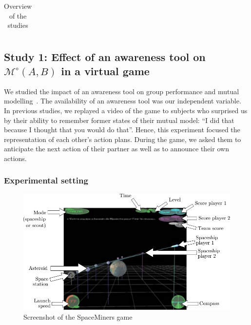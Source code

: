 \documentclass[natbib]{svjour3}
\newcommand{\gModel}[2]{{$\mathcal{M}^{\circ}(#1, #2)$}}
\begin{document}
\begin{table}[ht!]
\begin{tabular}{p{2.1cm}L{1.65cm}L{1.7cm}L{1.8cm}L{1.6cm}L{1.6cm}}
\bottomrule
\end{tabular}
\caption{Overview of the studies}
\label{synthesis_table}
\end{table}



\subsection{{\bf Study 1}: Effect of an awareness tool on \gModel{A}{B} in a virtual
game}

We studied the impact of an awareness tool on group performance and mutual
modelling~\citep{nova2007collaboration}. The availability of an
awareness tool was our independent variable. In previous studies, we replayed a
video of the game to subjects who surprised us by their ability to remember
former states of their mutual model: ``I did that because I thought that you
would do that''. Hence, this experiment focused the representation of each
other's action plans. During the game, we asked them to anticipate the next
action of their partner as well as to announce their own actions.

\subsubsection*{Experimental setting}

\begin{figure}
        \centering
        \includegraphics[width=\textwidth]{study1}
        \caption{Screenshot of the {\sc SpaceMiners} game}
        \label{study1:spaceminer}
\end{figure}
\end{document}
